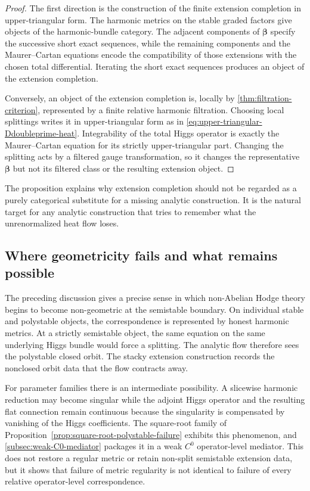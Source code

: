 \documentclass[11pt,reqno]{amsart}
\theoremstyle{definition}
\theoremstyle{remark}
\begin{document}
\begin{proof}
The first direction is the construction of the finite extension
completion in upper-triangular form.  The harmonic metrics on the stable
graded factors give objects of the harmonic-bundle category.  The
adjacent components of $\boldsymbol\beta$ specify the successive short
exact sequences, while the remaining components and the
Maurer--Cartan equations encode the compatibility of those extensions
with the chosen total differential.  Iterating the short exact
sequences produces an object of the extension completion.

Conversely, an object of the extension completion is, locally by
\cref{thm:filtration-criterion}, represented by a finite relative
harmonic filtration.  Choosing local splittings writes it in
upper-triangular form as in
\eqref{eq:upper-triangular-Ddoubleprime-heat}.  Integrability of the
total Higgs operator is exactly the Maurer--Cartan equation for its
strictly upper-triangular part.  Changing the splitting acts by a
filtered gauge transformation, so it changes the representative
$\boldsymbol\beta$ but not its filtered class or the resulting extension
object.
\end{proof}

The proposition explains why extension completion should not be regarded as a purely categorical substitute for a missing analytic construction.  It is the natural target for any analytic construction that tries to remember what the unrenormalized heat flow loses.

\subsection{Where geometricity fails and what remains possible}

The preceding discussion gives a precise sense in which non-Abelian Hodge theory begins to become non-geometric at the semistable boundary.  On individual stable and polystable objects, the correspondence is represented by honest harmonic metrics.  At a strictly semistable object, the same equation on the same underlying Higgs bundle would force a splitting.  The analytic flow therefore sees the polystable closed orbit.  The stacky extension construction records the nonclosed orbit data that the flow contracts away.

For parameter families there is an intermediate possibility.  A slicewise harmonic reduction may become singular while the adjoint Higgs operator and the resulting flat connection remain continuous because the singularity is compensated by vanishing of the Higgs coefficients.  The square-root family of Proposition~\ref{prop:square-root-polystable-failure} exhibits this phenomenon, and \cref{subsec:weak-C0-mediator} packages it in a weak $C^0$ operator-level mediator.  This does not restore a regular metric or retain non-split semistable extension data, but it shows that failure of metric regularity is not identical to failure of every relative operator-level correspondence.
\end{document}
